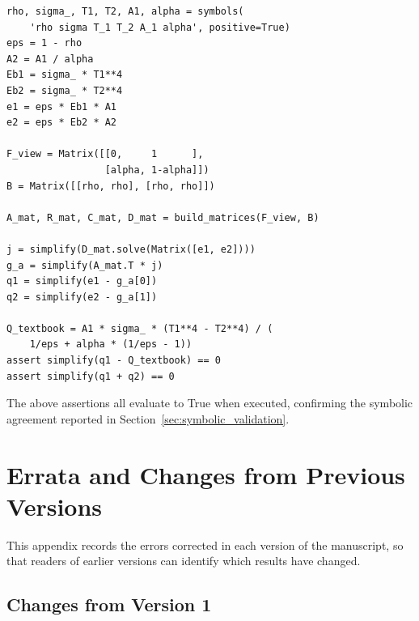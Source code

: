 \documentclass[preprint,1p,times]{elsarticle}
\theoremstyle{plain}
\theoremstyle{definition}
\theoremstyle{remark}
\begin{document}
\begin{verbatim}
rho, sigma_, T1, T2, A1, alpha = symbols(
    'rho sigma T_1 T_2 A_1 alpha', positive=True)
eps = 1 - rho
A2 = A1 / alpha
Eb1 = sigma_ * T1**4
Eb2 = sigma_ * T2**4
e1 = eps * Eb1 * A1
e2 = eps * Eb2 * A2

F_view = Matrix([[0,     1      ],
                 [alpha, 1-alpha]])
B = Matrix([[rho, rho], [rho, rho]])

A_mat, R_mat, C_mat, D_mat = build_matrices(F_view, B)

j = simplify(D_mat.solve(Matrix([e1, e2])))
g_a = simplify(A_mat.T * j)
q1 = simplify(e1 - g_a[0])
q2 = simplify(e2 - g_a[1])

Q_textbook = A1 * sigma_ * (T1**4 - T2**4) / (
    1/eps + alpha * (1/eps - 1))
assert simplify(q1 - Q_textbook) == 0
assert simplify(q1 + q2) == 0
\end{verbatim}

The above assertions all evaluate to True when executed, confirming the symbolic agreement reported in Section~\ref{sec:symbolic_validation}.

\section{Errata and Changes from Previous Versions}
\label{app:errata}

This appendix records the errors corrected in each version of the manuscript, so that readers of earlier versions can identify which results have changed.

\subsection{Changes from Version 1}
\label{app:errata_v1}
\end{document}
